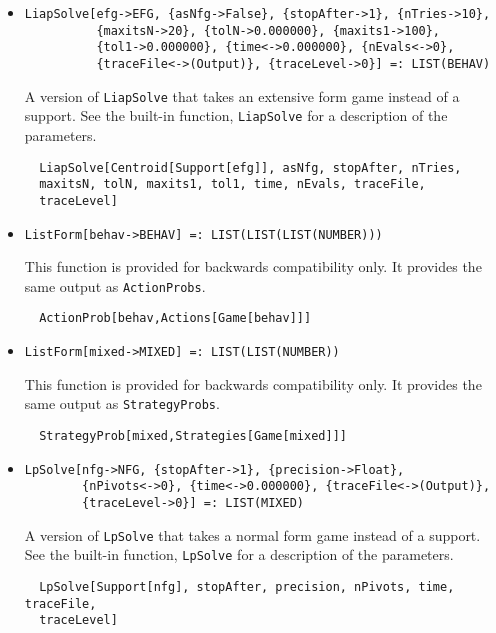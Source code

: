 \begin{itemize}
\item{}
\protect \large \begin{verbatim}
LiapSolve[efg->EFG, {asNfg->False}, {stopAfter->1}, {nTries->10}, 
          {maxitsN->20}, {tolN->0.000000}, {maxits1->100}, 
          {tol1->0.000000}, {time<->0.000000}, {nEvals<->0}, 
          {traceFile<->(Output)}, {traceLevel->0}] =: LIST(BEHAV) 
\end{verbatim}\normalsize

\bd 
A version of \verb+LiapSolve+ that takes an extensive form
game instead of a support.  See the built-in function,
\verb+LiapSolve+ for a description of the parameters.
\begin{verbatim}
  LiapSolve[Centroid[Support[efg]], asNfg, stopAfter, nTries,
  maxitsN, tolN, maxits1, tol1, time, nEvals, traceFile,
  traceLevel]
\end{verbatim} 
\ed

\item{}
\protect \large \begin{verbatim}
ListForm[behav->BEHAV] =: LIST(LIST(LIST(NUMBER))) 
\end{verbatim}\normalsize

\bd 
This function is provided for backwards compatibility only.  It
provides the same output as \verb+ActionProbs+.
\begin{verbatim}
  ActionProb[behav,Actions[Game[behav]]]
\end{verbatim} 
\ed

\item{}
\protect \large \begin{verbatim}
ListForm[mixed->MIXED] =: LIST(LIST(NUMBER)) 
\end{verbatim}\normalsize

\bd 
This function is provided for backwards compatibility only.  It
provides the same output as \verb+StrategyProbs+.
\begin{verbatim}
  StrategyProb[mixed,Strategies[Game[mixed]]]
\end{verbatim} 
\ed

\item{}
\protect \large \begin{verbatim}
LpSolve[nfg->NFG, {stopAfter->1}, {precision->Float}, 
        {nPivots<->0}, {time<->0.000000}, {traceFile<->(Output)}, 
        {traceLevel->0}] =: LIST(MIXED) 
\end{verbatim}\normalsize

\bd 
A version of \verb+LpSolve+ that takes a normal form
game instead of a support.  See the built-in function,
\verb+LpSolve+ for a description of the parameters.
\begin{verbatim}
  LpSolve[Support[nfg], stopAfter, precision, nPivots, time, traceFile, 
  traceLevel]
\end{verbatim} 
\ed


\end{itemize}
